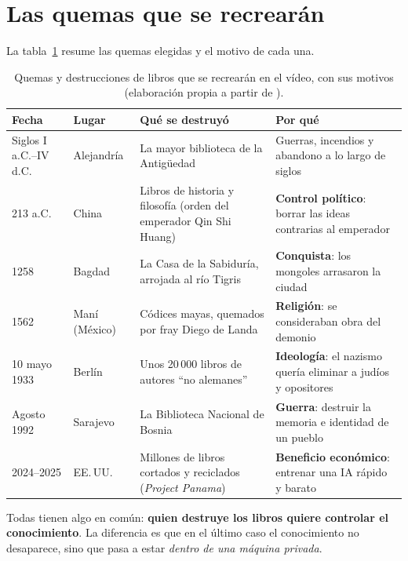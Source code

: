 \section{Las quemas que se recrearán}

La tabla~\ref{tab:quemas} resume las quemas elegidas y el motivo de cada una.

\begin{table}[htbp]
  \centering
  \caption[Quemas de libros recreadas en el vídeo]{Quemas y destrucciones de
    libros que se recrearán en el vídeo, con sus motivos
    (elaboración propia a partir de \cite{baez2004}).}
  \label{tab:quemas}
  \small
  \begin{tabularx}{\textwidth}{@{}llXX@{}}
    \toprule
    \textbf{Fecha} & \textbf{Lugar} & \textbf{Qué se destruyó} & \textbf{Por qué} \\
    \midrule
    Siglos I a.C.--IV d.C. & Alejandría & La mayor biblioteca de la Antigüedad
      & Guerras, incendios y abandono a lo largo de siglos \\
    213 a.C.  & China   & Libros de historia y filosofía (orden del emperador Qin Shi Huang)
      & \textbf{Control político}: borrar las ideas contrarias al emperador \\
    1258      & Bagdad  & La Casa de la Sabiduría, arrojada al río Tigris
      & \textbf{Conquista}: los mongoles arrasaron la ciudad \\
    1562      & Maní (México) & Códices mayas, quemados por fray Diego de Landa
      & \textbf{Religión}: se consideraban obra del demonio \\
    10 mayo 1933 & Berlín & Unos 20\,000 libros de autores ``no alemanes''
      & \textbf{Ideología}: el nazismo quería eliminar a judíos y opositores \\
    Agosto 1992 & Sarajevo & La Biblioteca Nacional de Bosnia
      & \textbf{Guerra}: destruir la memoria e identidad de un pueblo \\
    2024--2025 & EE.\,UU. & Millones de libros cortados y reciclados (\textit{Project Panama})
      & \textbf{Beneficio económico}: entrenar una IA rápido y barato \\
    \bottomrule
  \end{tabularx}
\end{table}

Todas tienen algo en común: \textbf{quien destruye los libros quiere controlar el
conocimiento}. La diferencia es que en el último caso el conocimiento no
desaparece, sino que pasa a estar \emph{dentro de una máquina privada}.

